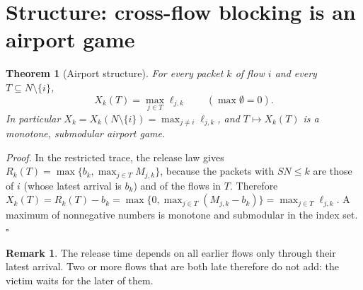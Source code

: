 \documentclass[11pt]{article}
\newtheorem{theorem}{Theorem}
\theoremstyle{definition}
\newtheorem{remark}{Remark}
\begin{document}
\section{Structure: cross-flow blocking is an airport game}
\begin{theorem}[Airport structure]\label{thm:airport}
For every packet $k$ of flow $i$ and every $T\subseteq N\setminus\{i\}$,
\[
X_k(T)=\max_{j\in T}\ell_{j,k}\qquad(\max\emptyset=0).
\]
In particular $X_k=X_k(N\setminus\{i\})=\max_{j\ne i}\ell_{j,k}$, and $T\mapsto X_k(T)$ is a monotone, submodular airport game.
\end{theorem}
\emph{Proof.} In the restricted trace, the release law gives $R_k(T)=\max\{b_k,\max_{j\in T}M_{j,k}\}$, because the packets with $SN\le k$ are those of $i$ (whose latest arrival is $b_k$) and of the flows in $T$. Therefore $X_k(T)=R_k(T)-b_k=\max\{0,\max_{j\in T}(M_{j,k}-b_k)\}=\max_{j\in T}\ell_{j,k}$. A maximum of nonnegative numbers is monotone and submodular in the index set. \hfill$\square$

\begin{remark}
The release time depends on all earlier flows only through their latest arrival. Two or more flows that are both late therefore do not add: the victim waits for the later of them.
\end{remark}
\end{document}
